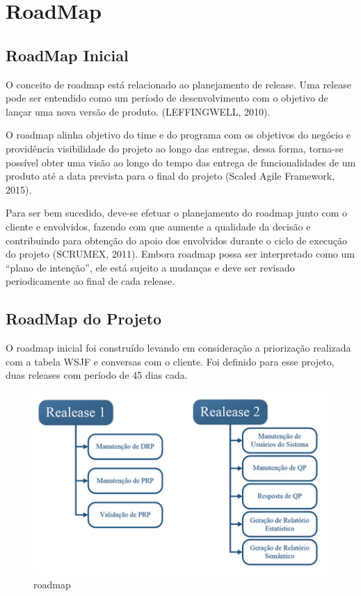 \section{RoadMap}
	\subsection{RoadMap Inicial}

	O conceito de roadmap está relacionado ao planejamento de release. Uma release pode ser entendido como um período de desenvolvimento com o objetivo de lançar uma nova versão de produto. (LEFFINGWELL, 2010). 

	O roadmap alinha objetivo do time e do programa com os objetivos do negócio e providência visibilidade do projeto ao longo das entregas, dessa forma, torna-se possível obter uma visão ao longo do tempo das entrega de funcionalidades de um produto até a data prevista para o final do projeto (Scaled Agile Framework, 2015).

	Para ser bem sucedido, deve-se efetuar o planejamento do roadmap junto com o cliente e envolvidos, fazendo com que aumente a qualidade da decisão e contribuindo para obtenção do apoio dos envolvidos durante o ciclo de execução do projeto (SCRUMEX, 2011). 					
	Embora roadmap possa ser interpretado como um “plano de intenção”, ele está sujeito a mudanças e deve ser revisado periodicamente ao final de cada release.

	\subsection{RoadMap do Projeto}

	O roadmap inicial foi construído levando em consideração a priorização realizada com a tabela WSJF e conversas com o cliente. Foi definido para esse projeto, duas releases com período de 45 dias cada.

	\begin{figure}[h]
		\centering
		\includegraphics{imagens/roadmap1.png}
		\caption{roadmap}
		\label{imagem}
	\end{figure}